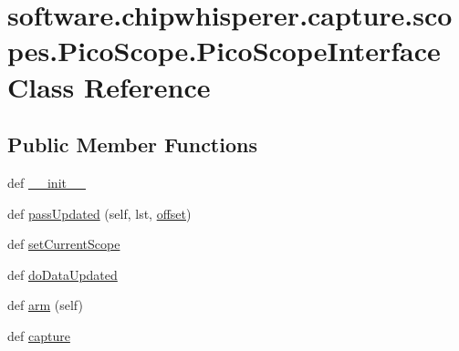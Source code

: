 \hypertarget{classsoftware_1_1chipwhisperer_1_1capture_1_1scopes_1_1PicoScope_1_1PicoScopeInterface}{}\section{software.\+chipwhisperer.\+capture.\+scopes.\+Pico\+Scope.\+Pico\+Scope\+Interface Class Reference}
\label{classsoftware_1_1chipwhisperer_1_1capture_1_1scopes_1_1PicoScope_1_1PicoScopeInterface}
\subsection*{Public Member Functions}
\begin{DoxyCompactItemize}
\item 
def \hyperlink{classsoftware_1_1chipwhisperer_1_1capture_1_1scopes_1_1PicoScope_1_1PicoScopeInterface_acabbf01f16afdcf09eab4c02baab16b1}{\+\_\+\+\_\+init\+\_\+\+\_\+}
\item 
def \hyperlink{classsoftware_1_1chipwhisperer_1_1capture_1_1scopes_1_1PicoScope_1_1PicoScopeInterface_aaf3513248c10f7a67b84ba6a68af4a51}{pass\+Updated} (self, lst, \hyperlink{classsoftware_1_1chipwhisperer_1_1capture_1_1scopes_1_1PicoScope_1_1PicoScopeInterface_a88fef1117fcd30aadc8ece3e9af43eec}{offset})
\item 
def \hyperlink{classsoftware_1_1chipwhisperer_1_1capture_1_1scopes_1_1PicoScope_1_1PicoScopeInterface_a323e934bd546825ab8fc3f8ace3638ee}{set\+Current\+Scope}
\item 
def \hyperlink{classsoftware_1_1chipwhisperer_1_1capture_1_1scopes_1_1PicoScope_1_1PicoScopeInterface_a6a5878dd35ec7c054f86630c4c0edd4e}{do\+Data\+Updated}
\item 
def \hyperlink{classsoftware_1_1chipwhisperer_1_1capture_1_1scopes_1_1PicoScope_1_1PicoScopeInterface_aac762ad44770bff91903df5f92afaba5}{arm} (self)
\item 
def \hyperlink{classsoftware_1_1chipwhisperer_1_1capture_1_1scopes_1_1PicoScope_1_1PicoScopeInterface_a26f90a11ae19350a2c4cf3c75279e06c}{capture}
\end{DoxyCompactItemize}

